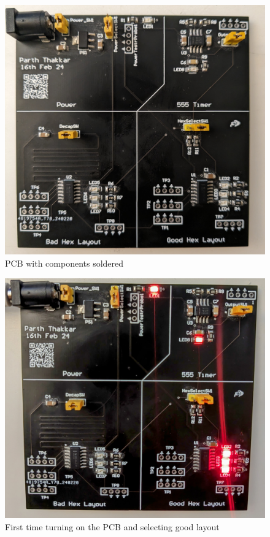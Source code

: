 \documentclass[a4paper,11pt]{article}%
\begin{document}
\begin{figure}[H]
	\centering
	\includegraphics[scale=0.1]{figures/board.jpg}
	\caption{PCB with components soldered}
\end{figure}


\begin{figure}[H]
	\centering
	\includegraphics[scale=0.1]{figures/goodpcb.jpg}
	\caption{First time turning on the PCB and selecting good layout}
\end{figure}
\end{document}

